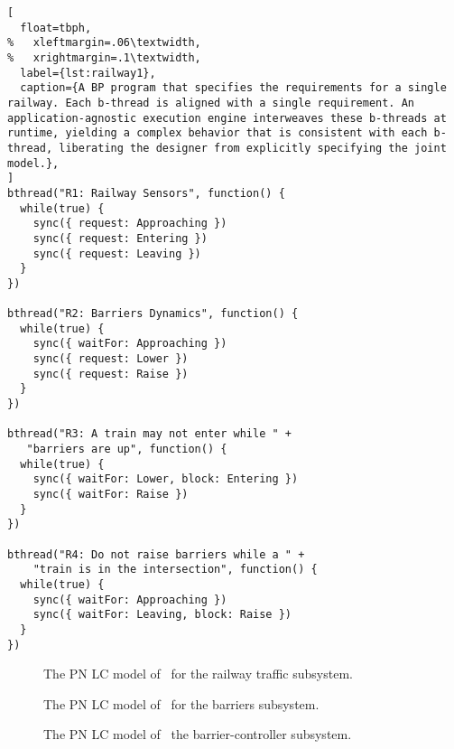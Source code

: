 \documentclass[10pt,journal,compsoc]{IEEEtran}
\theoremstyle{definition}
\begin{document}
\begin{lstlisting}[
  float=tbph,
%   xleftmargin=.06\textwidth,
%   xrightmargin=.1\textwidth,
  label={lst:railway1},
  caption={A BP program that specifies the requirements for a single railway. Each b-thread is aligned with a single requirement. An application-agnostic execution engine interweaves these b-threads at runtime, yielding a complex behavior that is consistent with each b-thread, liberating the designer from explicitly specifying the joint model.},
]
bthread("R1: Railway Sensors", function() {
  while(true) {
    sync({ request: Approaching })
    sync({ request: Entering })
    sync({ request: Leaving })
  }
})

bthread("R2: Barriers Dynamics", function() {
  while(true) {
    sync({ waitFor: Approaching })
    sync({ request: Lower })
    sync({ request: Raise })
  }
})

bthread("R3: A train may not enter while " +
   "barriers are up", function() {
  while(true) {
    sync({ waitFor: Lower, block: Entering })
    sync({ waitFor: Raise })
  }
})

bthread("R4: Do not raise barriers while a " +
    "train is in the intersection", function() {
  while(true) {
    sync({ waitFor: Approaching })
    sync({ waitFor: Leaving, block: Raise })
  }
})
\end{lstlisting}

\begin{figure}
  \centering
{}
  \caption{The PN LC model of~\cite{leveson1987safety} for the railway traffic subsystem.}
  \label{fig:railway_lpn}
\end{figure}

\begin{figure}
  \centering
{}
  \caption{The PN LC model of~\cite{leveson1987safety} for the barriers subsystem.}
  \label{fig:barrier}
\end{figure}

\begin{figure}
  \centering
{}
  \caption{The PN LC model of~\cite{leveson1987safety} the barrier-controller subsystem.}
  \label{fig:barrier_controller}
\end{figure}
\end{document}
